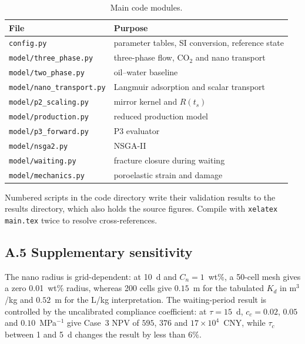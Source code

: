 \documentclass{swmcmthesis}
\begin{document}
\begin{table}[h!t]
\centering
\caption{Main code modules.}
\small
\begin{tabular}{ll}
\toprule[1.5pt]
File & Purpose\\
\midrule[1pt]
\texttt{config.py} & parameter tables, SI conversion, reference state\\
\texttt{model/three\_phase.py} & three-phase flow, CO$_2$ and nano transport\\
\texttt{model/two\_phase.py} & oil--water baseline\\
\texttt{model/nano\_transport.py} & Langmuir adsorption and scalar transport\\
\texttt{model/p2\_scaling.py} & mirror kernel and $R(t_s)$\\
\texttt{model/production.py} & reduced production model\\
\texttt{model/p3\_forward.py} & P3 evaluator\\
\texttt{model/nsga2.py} & NSGA-II\\
\texttt{model/waiting.py} & fracture closure during waiting\\
\texttt{model/mechanics.py} & poroelastic strain and damage\\
\bottomrule[1.5pt]
\end{tabular}
\end{table}

Numbered scripts in the code directory write their validation results to the
results directory, which also holds the source figures.
Compile with \texttt{xelatex main.tex} twice to resolve cross-references.

\subsection*{A.5 Supplementary sensitivity}

The nano radius is grid-dependent: at 10~d and $C_n=1$~wt\%, a 50-cell mesh
gives a zero 0.01~wt\% radius, whereas 200 cells give $0.15$~m for the
tabulated $K_d$ in m$^3$/kg and $0.52$~m for the L/kg interpretation. The
waiting-period result is controlled by the uncalibrated compliance
coefficient: at $\tau=15$~d, $c_c=0.02$, $0.05$ and $0.10$~MPa$^{-1}$ give
Case~3 NPV of $595$, $376$ and $17\times10^4$~CNY, while $\tau_c$ between
1 and 5~d changes the result by less than $6\%$.
\end{document}
